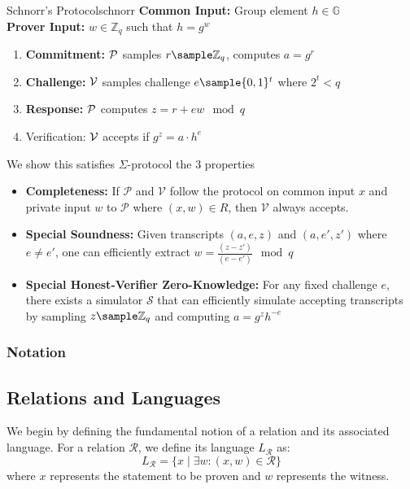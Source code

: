 \begin{protocol}{Schnorr's Protocol}{schnorr}\label{prot:schnorr}
\textbf{Common Input:} Group element $h \in \mathbb{G}$\\
\textbf{Prover Input:} $w \in \mathbb{Z}_q$ such that $h = g^w$
\begin{enumerate}
    \item \textbf{Commitment:} $\mathcal{P}$ samples $r \sample \Z_q$, computes $a = g^r$
    \item \textbf{Challenge:} $\mathcal{V}$ samples challenge $e \sample \{0,1\}^t$ where $2^t < q$
    \item \textbf{Response:} $\mathcal{P}$ computes $z = r + ew \mod q$
    \item Verification: $\mathcal{V}$ accepts if $g^z = a \cdot h^e$
\end{enumerate}
\end{protocol}

\noindent We show this satisfies $\Sigma$-protocol the 3 properties

\begin{itemize}
    \item \textbf{Completeness:} If $\mathcal{P}$ and $\mathcal{V}$ follow the protocol on common input $x$ and private input $w$ to $\mathcal{P}$ where $(x,w) \in R$, then $\mathcal{V}$ always accepts.
    
    \item \textbf{Special Soundness:} Given transcripts $(a,e,z)$ and $(a,e',z')$ where $e \neq e'$, one can efficiently extract $w = \frac{(z-z')}{(e-e')} \mod q$
    
    \item \textbf{Special Honest-Verifier Zero-Knowledge:} For any fixed challenge $e$, there exists a simulator $\mathcal{S}$ that can efficiently simulate accepting transcripts by sampling $z \sample \Z_q$ and computing $a = g^z h^{-e}$

    
\end{itemize}


\subsubsection{Notation}

\subsection{Relations and Languages}
We begin by defining the fundamental notion of a relation and its associated language. For a relation $\mathcal{R}$, we define its language $L_\mathcal{R}$ as:
\[
    L_\mathcal{R} = \{x \mid \exists w : (x,w) \in \mathcal{R}\}
\]
where $x$ represents the statement to be proven and $w$ represents the witness.

